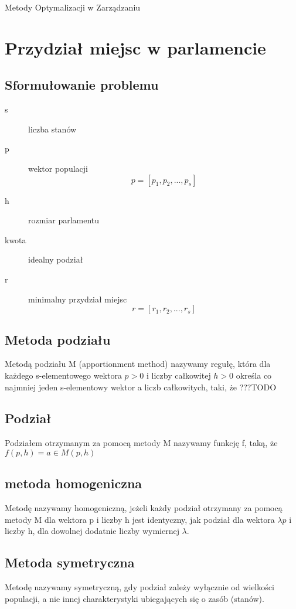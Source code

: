 \documentclass[12pt,a4paper]{article}
\begin{document}
\lstset{language=Pascal}
Metody Optymalizacji w Zarządzaniu
\newpage
\tableofcontents
\section{Przydział miejsc w parlamencie}
\subsection{Sformułowanie problemu}
\begin{description}
\item[s] liczba stanów
\item [p ]wektor populacji
\begin{equation}
p=[p_1, p_2, ... , p_s]
\end{equation}
\item [h] rozmiar parlamentu
\item[kwota] idealny podział
\item[r] minimalny przydział miejsc
\begin{equation}
r=[r_1, r_2, ... , r_s]
\end{equation}
\end{description}
\subsection{Metoda podziału}
Metodą podziału M (apportionment method) nazywamy regułę, która dla każdego s-elementowego wektora $ p>0 $ i liczby całkowitej $h  >0$ określa co najmniej jeden s-elementowy wektor a liczb całkowitych, taki, że ???TODO
\subsection{Podział}
Podziałem otrzymanym za pomocą metody M
 nazywamy funkcję f, taką, że 
 $f(p, h) =  a \in M(p, h)$
\subsection{metoda homogeniczna}
Metodę nazywamy homogeniczną, jeżeli każdy podział otrzymany za pomocą metody M dla wektora p i liczby h jest identyczny, jak podział dla wektora $\lambda p$ i liczby h, dla
dowolnej dodatnie liczby wymiernej $ \lambda$. 
\subsection{Metoda symetryczna}
Metodę nazywamy symetryczną, gdy podział zależy wyłącznie od wielkości populacji, a nie innej charakterystyki ubiegających się o zasób (stanów).
\end{document}
